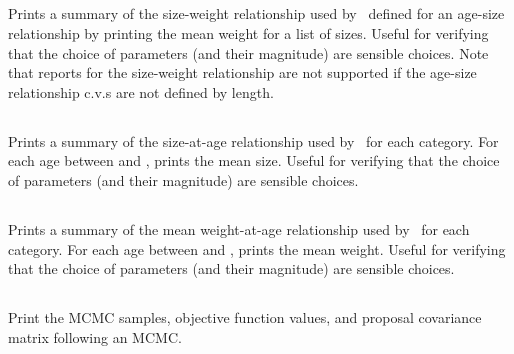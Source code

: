 \subsection{\label{sec:report-size-weight}}

Prints a summary of the size-weight relationship used by \SPM\ defined for an age-size relationship by printing the mean weight for a list of sizes. Useful for verifying that the choice of parameters (and their magnitude) are sensible choices. Note that reports for the size-weight relationship are not supported if the age-size relationship c.v.s are not defined by length.

\subsection{\label{sec:report-age-size}}

Prints a summary of the size-at-age relationship used by \SPM\ for each category. For each age between  and , prints the mean size. Useful for verifying that the choice of parameters (and their magnitude) are sensible choices.

\subsection{\label{sec:report-age-weight}}

Prints a summary of the mean weight-at-age relationship used by \SPM\ for each category. For each age between  and , prints the mean weight. Useful for verifying that the choice of parameters (and their magnitude) are sensible choices.

\subsection{}

Print the MCMC samples, objective function values, and proposal covariance matrix following an MCMC.

\subsection{}

